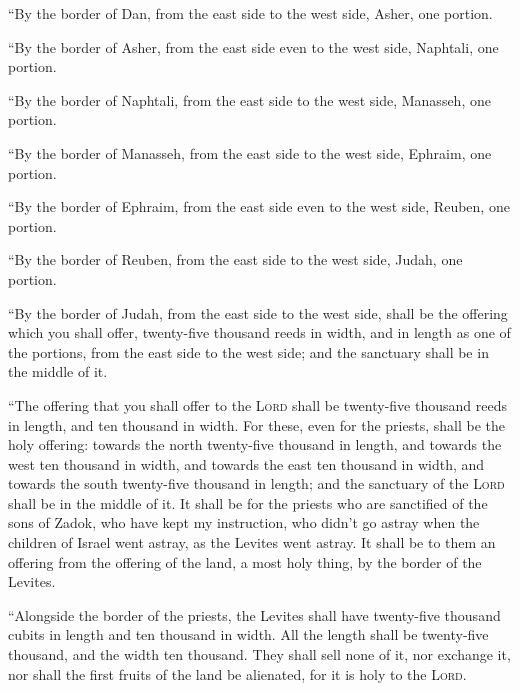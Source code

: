  ``By the border of Dan, from the east side to the west
side, Asher, one portion.

 ``By the border of Asher, from the east side even to the
west side, Naphtali, one portion.

 ``By the border of Naphtali, from the east side to the
west side, Manasseh, one portion.

 ``By the border of Manasseh, from the east side to the
west side, Ephraim, one portion.

 ``By the border of Ephraim, from the east side even to
the west side, Reuben, one portion.

 ``By the border of Reuben, from the east side to the west
side, Judah, one portion.

 ``By the border of Judah, from the east side to the west
side, shall be the offering which you shall offer, twenty-five thousand
reeds in width, and in length as one of the portions, from the east side
to the west side; and the sanctuary shall be in the middle of it.

 ``The offering that you shall offer to the \textsc{Lord}
shall be twenty-five thousand reeds in length, and ten thousand in
width.  For these, even for the priests, shall be the
holy offering: towards the north twenty-five thousand in length, and
towards the west ten thousand in width, and towards the east ten
thousand in width, and towards the south twenty-five thousand in length;
and the sanctuary of the \textsc{Lord} shall be in the middle of it.
 It shall be for the priests who are sanctified of the
sons of Zadok, who have kept my instruction, who didn't go astray when
the children of Israel went astray, as the Levites went astray.
 It shall be to them an offering from the offering of the
land, a most holy thing, by the border of the Levites.

 ``Alongside the border of the priests, the Levites shall
have twenty-five thousand cubits in length and ten thousand in width.
All the length shall be twenty-five thousand, and the width ten
thousand.  They shall sell none of it, nor exchange it,
nor shall the first fruits of the land be alienated, for it is holy to
the \textsc{Lord}.

